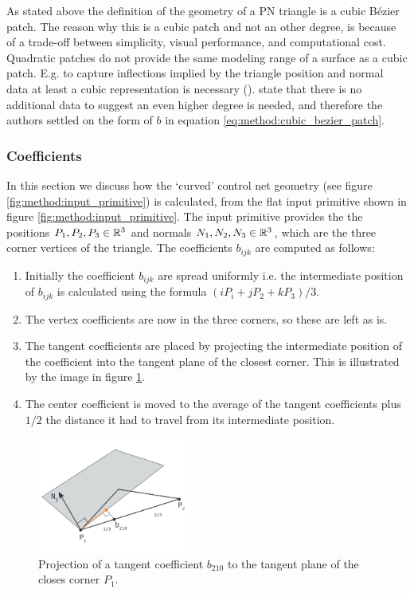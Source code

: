 As stated above the definition of the geometry of a PN triangle is a cubic B\'ezier patch. The reason why this is a cubic patch and not an other degree, is because of a trade-off between simplicity, visual performance, and computational cost. Quadratic patches do not provide the same modeling range of a surface as a cubic patch. E.g. to capture inflections implied by the triangle position and normal data at least a cubic representation is necessary ().\citeauthor{vlachos2001curved} state that there is no additional data to suggest an even higher degree is needed, and therefore the authors settled on the form of $b$ in equation \ref{eq:method:cubic_bezier_patch}.

\subsubsection{Coefficients} \label{sss:control_point_construction}
In this section we discuss how the `curved' control net geometry (see figure \ref{fig:method:input_primitive}) is calculated, from the flat input primitive shown in figure \ref{fig:method:input_primitive}. The input primitive provides the the positions $P_1, P_2, P_3 \in \mathbb{R}^3$ and normals $N_1, N_2, N_3 \in \mathbb{R}^3$, which are the three corner vertices of the triangle. The coefficients $b_{ijk}$ are computed as follows:
%
\begin{enumerate}
	\item Initially the coefficient $b_{ijk}$ are spread uniformly i.e. the intermediate position of $b_{ijk}$ is calculated using the formula $(i P_i + j P_2 + kP_3) / 3$.
	\item The vertex coefficients are now in the three corners, so these are left as is.
	\item The tangent coefficients are placed by projecting the intermediate position of the coefficient into the tangent plane of the closest corner. This is illustrated by the image in figure \ref{fig:method:geometry_tangent_projection.png}.
	\item The center coefficient is moved to the average of the tangent coefficients plus $1/2$ the distance it had to travel from its intermediate position.
\end{enumerate}
%
\begin{figure}
	\centering
	\includegraphics[width=0.45\textwidth]{./content/img/method/geometry_tangent_projection.png}
	\caption{Projection of a tangent coefficient $b_{210}$ to the tangent plane of the closes corner $P_1$.}
	\label{fig:method:geometry_tangent_projection.png}
\end{figure}
